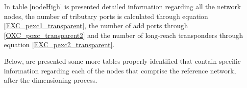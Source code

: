 In table \ref{nodeHigh} is presented detailed information regarding all the network nodes, the number of tributary ports is calculated through equation \ref{EXC_pexc1_transparent}, the number of add ports through \ref{OXC_poxc_transparent2} and the number of long-reach transponders through equation \ref{EXC_pexc2_transparent}.



\begin{table}[H]
\centering
{}
\caption{Node information for high traffic scenario.}
\label{nodeHigh}
\end{table}

\vspace{11pt}

Below, are presented some more tables properly identified that contain specific information regarding each of the nodes that comprise the reference network, after the dimensioning process.


